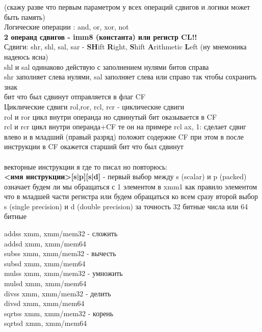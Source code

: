 \documentclass[a4paper,10pt]{article}
\begin{document}
(скажу разве что первым параметром у всех операций сдвигов и логики может быть память) \\
Логические операции : and, or, xor, not \\
\textbf{2 операнд сдвигов - imm8 (константа) или регистр CL!!} \\
Сдвиги: shr, shl, sal, sar - \textbf{SH}ift \textbf{R}ight, \textbf{S}hift \textbf{A}rithmetic \textbf{L}eft (ну мнемоника надеюсь ясна) \\
shl и sal одинаково действую с заполнением нулями битов справа \\
shr заполняет слева нулями, sal заполняет слева или справо так чтобы сохранить знак \\
бит что был сдвинут отправляется в флаг CF \\
Циклические сдвиги rol,ror, rcl, rcr - циклические сдвиги\\
rol и ror цикл внутри операнда но сдвинутый бит оказывается в CF \\
rcl и rcr цикл внутри операнда+CF те он на примере rcl ax, 1: сделает сдвиг влево и в младший (правый разряд) положит содержие CF при этом в после инструкции в CF окажется старший бит что был сдвинут \\
\vspace{0.5cm} \\
векторные инструкции я где то писал но повторюсь: \\
\textbf{<имя инструкции>[s|p][s|d]} - первый выбор между s  (scalar) и p (packed) означает будем ли мы обращаться с 1 элементом в xmm1 как правило элементом что в младшей части регистра или будем обращаться ко всем сразу второй выбор s (single precision) и d (double precision) за точность 32 битные числа или 64 битные \\
\begin{multicols}{2}
    \noindent
    addss xmm, xmm/mem32 - сложить \\
    addsd xmm, xmm/mem64  \\
    subss xmm, xmm/mem32 - вычесть \\
    subsd xmm, xmm/mem64 \\
    mulss xmm, xmm/mem32 - умножить \\
    mulsd xmm, xmm/mem64 \\
    divss xmm, xmm/mem32 - делить \\
    divsd xmm, xmm/mem64 \\
    sqrtss xmm, xmm/mem32 - корень \\
    sqrtsd xmm, xmm/mem64 \\
\end{multicols}
\end{document}
